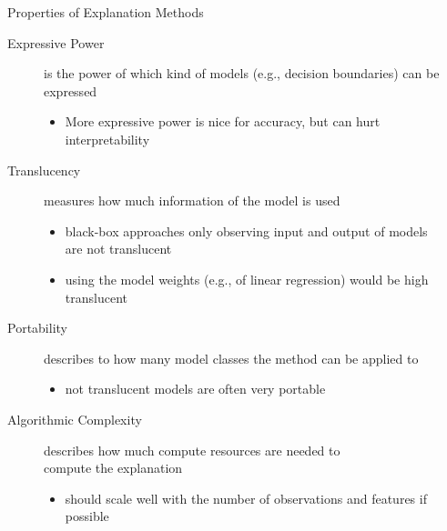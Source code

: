 \documentclass[aspectratio=169]{../latex_main/tntbeamer}  %
\begin{document}
\begin{frame}[c]{Properties of Explanation Methods }
	
	\begin{description}
        \item[Expressive Power] is the power of which kind of models (e.g., decision boundaries) can be expressed 
        \begin{itemize}
            \item More expressive power is nice for accuracy, but can hurt interpretability
        \end{itemize}
        \medskip
        \pause
        \item[Translucency] measures how much information of the model is used
        \begin{itemize}
            \item black-box approaches only observing input and output of models\\ are not translucent
            \item using the model weights (e.g., of linear regression) would be high translucent
        \end{itemize}
        \medskip
        \pause
        \item[Portability] describes to how many model classes the method can be applied to
        \begin{itemize}
            \item not translucent models are often very portable
        \end{itemize}
        \medskip
        \pause
        \item[Algorithmic Complexity] describes how much compute resources are needed to\\ compute the explanation
        \begin{itemize}
            \item should scale well with the number of observations and features if possible
        \end{itemize}
        
	\end{description}
\end{frame}
\end{document}

